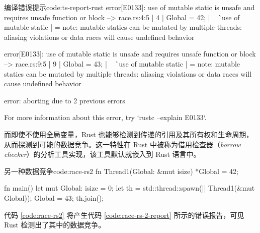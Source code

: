 \documentclass[a4paper, 12pt]{article} %
\newcounter{code}
\numberwithin{equation}{section}
\begin{document}
\begin{code}[{}]{编译错误提示}{code:ts-report-rust}
  error[E0133]: use of mutable static is unsafe and requires unsafe function or block
  --> race.rs:4:5
   |
 4 |   Global = 42;
   |   ^^^^^^^^^^^ use of mutable static
   |
   = note: mutable statics can be mutated by multiple threads: aliasing violations or data races will cause undefined behavior
 
 error[E0133]: use of mutable static is unsafe and requires unsafe function or block
  --> race.rs:9:5
   |
 9 |   Global = 43;
   |   ^^^^^^^^^^^ use of mutable static
   |
   = note: mutable statics can be mutated by multiple threads: aliasing violations or data races will cause undefined behavior
 
 error: aborting due to 2 previous errors
 
 For more information about this error, try `rustc --explain E0133`.
\end{code}

而即使不使用全局变量，Rust 也能够检测到传递的引用及其所有权和生命周期，从而探测到可能的数据竞争。这一特性在 Rust 中被称为借用检查器（\textit{borrow checker}）的分析工具实现，该工具默认就嵌入到 Rust 语言中。

\begin{code}{另一种数据竞争}{code:race-rs2}
  fn Thread1(Global: &mut isize) {
    *Global = 42;
  }

  fn main() {
    let mut Global: isize = 0;
    let th = std::thread::spawn(|| Thread1(&mut Global));
    Global = 43;
    th.join();
  }
\end{code}

代码 \ref{code:race-rs2} 将产生代码 \ref{code:race-rs-2-report} 所示的错误报告，可见 Rust 检测出了其中的数据竞争。
\end{document}
